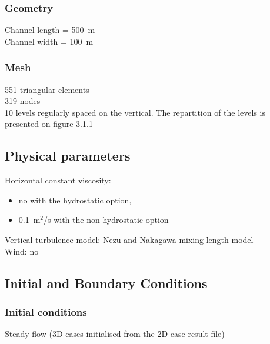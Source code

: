 \subsubsection{Geometry}
%
Channel length = 500~m\\
Channel width = 100~m
%
\subsubsection{Mesh}
%
551 triangular elements\\
319 nodes\\
10 levels regularly spaced on the vertical.
The repartition of the levels is presented on figure 3.1.1
%
%
%
\subsection{Physical parameters}
%
Horizontal constant viscosity:
\begin{itemize}
\item no with the hydrostatic option,
\item 0.1~m$^2$/s with the non-hydrostatic option
\end{itemize}
Vertical turbulence model: Nezu and Nakagawa mixing length model\\
Wind: no
%
%
%
%
%
%
\subsection{Initial and Boundary Conditions}
%
\subsubsection{Initial conditions}
%
Steady flow (3D cases initialised from the 2D case result file)
%
